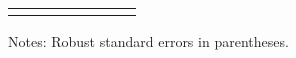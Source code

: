 \begin{table}[H]
{\begin{threeparttable}
\begin{tabular}{lccccccc}
\bottomrule[0.5pt]                                                                               \label{tab:table2}                                                                       \end{tabular}                                                                                                    \vspace{-13pt}                                                                                           \begin{tablenotes}[flushleft]{\setlength{\itemindent}{-3pt}}          \small                                                                                                           \item Notes: Robust standard errors in   parentheses.            \end{tablenotes}                                                                                         \end{threeparttable}                                                                             }                                                                                                                        \end{table}

